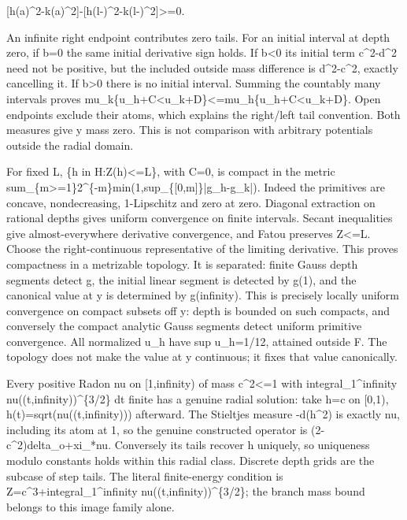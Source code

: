 \documentclass[11pt]{article}
\begin{document}
[h(a)\textasciicircum{}2-k(a)\textasciicircum{}2]-[h(l-)\textasciicircum{}2-k(l-)\textasciicircum{}2]>=0.

An infinite right endpoint contributes zero tails. For an initial interval at depth zero, if b=0 the same initial derivative sign holds. If b<0 its initial term c\textasciicircum{}2-d\textasciicircum{}2 need not be positive, but the included outside mass difference is d\textasciicircum{}2-c\textasciicircum{}2, exactly cancelling it. If b>0 there is no initial interval. Summing the countably many intervals proves mu\_k\{u\_h+C<u\_k+D\}<=mu\_h\{u\_h+C<u\_k+D\}. Open endpoints exclude their atoms, which explains the right/left tail convention. Both measures give y mass zero. This is not comparison with arbitrary potentials outside the radial domain.

For fixed L, \{h in H:Z(h)<=L\}, with C=0, is compact in the metric sum\_\{m>=1\}2\textasciicircum{}\{-m\}min(1,sup\_\{[0,m]\}|g\_h-g\_k|). Indeed the primitives are concave, nondecreasing, 1-Lipschitz and zero at zero. Diagonal extraction on rational depths gives uniform convergence on finite intervals. Secant inequalities give almost-everywhere derivative convergence, and Fatou preserves Z<=L. Choose the right-continuous representative of the limiting derivative. This proves compactness in a metrizable topology. It is separated: finite Gauss depth segments detect g, the initial linear segment is detected by g(1), and the canonical value at y is determined by g(infinity). This is precisely locally uniform convergence on compact subsets off y: depth is bounded on such compacts, and conversely the compact analytic Gauss segments detect uniform primitive convergence. All normalized u\_h have sup u\_h=1/12, attained outside F. The topology does not make the value at y continuous; it fixes that value canonically.

Every positive Radon nu on [1,infinity) of mass c\textasciicircum{}2<=1 with integral\_1\textasciicircum{}infinity nu((t,infinity))\textasciicircum{}\{3/2\} dt finite has a genuine radial solution: take h=c on [0,1), h(t)=sqrt(nu((t,infinity))) afterward. The Stieltjes measure -d(h\textasciicircum{}2) is exactly nu, including its atom at 1, so the genuine constructed operator is (2-c\textasciicircum{}2)delta\_o+xi\_*nu. Conversely its tails recover h uniquely, so uniqueness modulo constants holds within this radial class. Discrete depth grids are the subcase of step tails. The literal finite-energy condition is Z=c\textasciicircum{}3+integral\_1\textasciicircum{}infinity nu((t,infinity))\textasciicircum{}\{3/2\}; the branch mass bound belongs to this image family alone.
\end{document}
